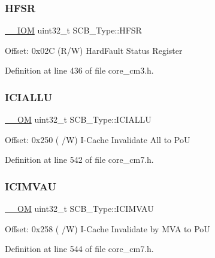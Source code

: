 \subsubsection{\texorpdfstring{H\+F\+SR}{HFSR}}
{\footnotesize\ttfamily \hyperlink{core__sc300_8h_ab6caba5853a60a17e8e04499b52bf691}{\+\_\+\+\_\+\+I\+OM} uint32\+\_\+t S\+C\+B\+\_\+\+Type\+::\+H\+F\+SR}

Offset\+: 0x02C (R/W) Hard\+Fault Status Register 

Definition at line 436 of file core\+\_\+cm3.\+h.

\mbox{\label{struct_s_c_b___type_a573260e7836dbc43707df97dd475a0c8}} 
\subsubsection{\texorpdfstring{I\+C\+I\+A\+L\+LU}{ICIALLU}}
{\footnotesize\ttfamily \hyperlink{core__sc300_8h_a0ea2009ed8fd9ef35b48708280fdb758}{\+\_\+\+\_\+\+OM} uint32\+\_\+t S\+C\+B\+\_\+\+Type\+::\+I\+C\+I\+A\+L\+LU}

Offset\+: 0x250 ( /W) I-\/\+Cache Invalidate All to PoU 

Definition at line 542 of file core\+\_\+cm7.\+h.

\mbox{\label{struct_s_c_b___type_a5eca5a3e5aedd89a9655df8f5798e2b0}} 
\subsubsection{\texorpdfstring{I\+C\+I\+M\+V\+AU}{ICIMVAU}}
{\footnotesize\ttfamily \hyperlink{core__sc300_8h_a0ea2009ed8fd9ef35b48708280fdb758}{\+\_\+\+\_\+\+OM} uint32\+\_\+t S\+C\+B\+\_\+\+Type\+::\+I\+C\+I\+M\+V\+AU}

Offset\+: 0x258 ( /W) I-\/\+Cache Invalidate by M\+VA to PoU 

Definition at line 544 of file core\+\_\+cm7.\+h.

\mbox{\label{struct_s_c_b___type_a0ca18ef984d132c6bf4d9b61cd00f05a}} 
